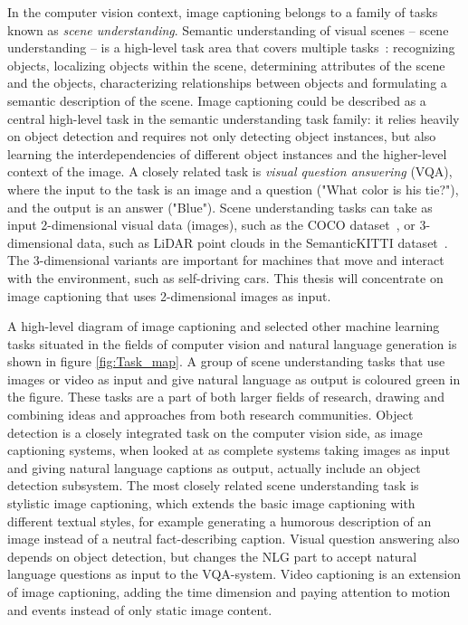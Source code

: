 \documentclass[english,twoside,openright]{HYgraduMLDS}
\begin{document}
In the computer vision context, image captioning belongs to a family of tasks known as \textit{scene understanding}. Semantic understanding of visual scenes -- scene understanding -- is a high-level task area that covers multiple tasks~\cite{Coco, zhou2017scene}: recognizing objects, localizing objects within the scene, determining attributes of the scene and the objects, characterizing relationships between objects and formulating a semantic description of the scene. Image captioning could be described as a central high-level task in the semantic understanding task family: it relies heavily on object detection and requires not only detecting object instances, but also learning the interdependencies of different object instances and the higher-level context of the image. A closely related task is \textit{visual question answering} (VQA), where the input to the task is an image and a question ("What color is his tie?"), and the output is an answer ("Blue"). Scene understanding tasks can take as input 2-dimensional visual data (images), such as the COCO dataset~\cite{Coco}, or 3-dimensional data, such as LiDAR point clouds in the SemanticKITTI dataset~\cite{SemanticKITTI}. The 3-dimensional variants are important for machines that move and interact with the environment, such as self-driving cars. This thesis will concentrate on image captioning that uses 2-dimensional images as input.

A high-level diagram of image captioning and selected other machine learning tasks situated in the fields of computer vision and natural language generation is shown in figure \ref{fig:Task_map}. A group of scene understanding tasks that use images or video as input and give natural language as output is coloured green in the figure. These tasks are a part of both larger fields of research, drawing and combining ideas and approaches from both research communities. Object detection is a closely integrated task on the computer vision side, as image captioning systems, when looked at as complete systems taking images as input and giving natural language captions as output, actually include an object detection subsystem. The most closely related scene understanding task is stylistic image captioning, which extends the basic image captioning with different textual styles, for example generating a humorous description of an image instead of a neutral fact-describing caption. Visual question answering also depends on object detection, but changes the NLG part to accept natural language questions as input to the VQA-system. Video captioning is an extension of image captioning, adding the time dimension and paying attention to motion and events instead of only static image content. 
\end{document}
